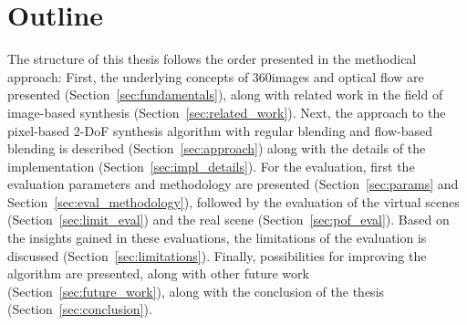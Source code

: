

\section*{Outline}
The structure of this thesis follows the order presented in the methodical approach: 
First, the underlying concepts of 360\degree images and optical flow are presented (Section~\ref{sec:fundamentals}), along with related work in the field of image-based synthesis (Section~\ref{sec:related_work}). Next, the approach to the pixel-based 2-DoF synthesis algorithm with regular blending and flow-based blending is described (Section~\ref{sec:approach}) along with the details of the implementation (Section~\ref{sec:impl_details}).
For the evaluation, first the evaluation parameters and methodology are presented (Section~\ref{sec:params} and Section~\ref{sec:eval_methodology}), followed by the evaluation of the virtual scenes (Section~\ref{sec:limit_eval}) and the real scene (Section~\ref{sec:pof_eval}). Based on the insights gained in these evaluations, the limitations of the evaluation is discussed (Section~\ref{sec:limitations}).
Finally, possibilities for improving the algorithm are presented, along with other future work (Section~\ref{sec:future_work}), along with the conclusion of the thesis (Section~\ref{sec:conclusion}).

